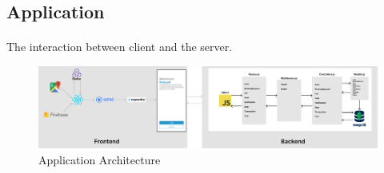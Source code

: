                 \subsection{Application}
                \paragraph*{}
                 The interaction between client and the server. \\
        
                    \begin{figure}[h]
                        \centering
                        \includegraphics[width=1\textwidth]{images/WholeArcitectrue.png}
                        \caption{Application Architecture}
                        \label{fig:Architecture}
                    \end{figure}

